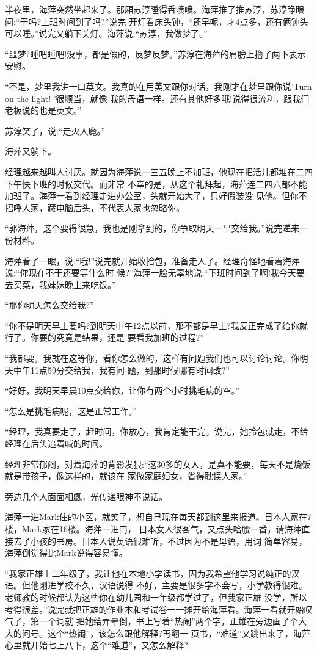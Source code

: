 \documentclass[11pt,a4paper,onecolumn]{article}
\begin{document}
半夜里，海萍突然坐起来了。那厢苏淳睡得香喷喷。海萍推了推苏淳，苏淳睁眼问:``干吗?上班时间到了吗?''说完
开灯看床头钟，``还早呢，才4点多，还有俩钟头可以睡。''说完又躺下关灯。海萍说:``苏淳，我做梦了。''

``噩梦?睡吧睡吧!没事，都是假的，反梦反梦。''苏淳在海萍的肩膀上撸了两下表示安慰。

``不是，梦里我讲一口英文。我真的在用英文跟你对话，我刚才在梦里跟你说'Turn on the light! '很顺当，就像
我的母语一样。还有其他好多哦!说得很流利，跟我们老板说的也是英文。''

苏淳笑了，说:``走火入魔。''

海萍又躺下。

经理越来越叫人讨厌。就因为海萍说一三五晚上不加班，他现在把活儿都堆在二四下午快下班的时候交代。而非常
不幸的是，从这个礼拜起，海萍连二四六都不能加班了。海萍一看到经理走进办公室，头就开始大了，只好假装没
见他。但你不招呼人家，藏电脑后头，不代表人家也忽略你。

``郭海萍，这个要得很急，我也是刚拿到的，你争取明天一早交给我。''说完递来一份材料。

海萍看了一眼，说:``哦!''说完就开始收拾包，准备走人了。经理奇怪地看着海萍说:``你现在不干还要等什么时
候?''海萍一脸无辜地说:``下班时间到了啊!我今天要去买菜，我妹妹晚上来吃饭。''

``那你明天怎么交给我?''

``你不是明天早上要吗?到明天中午12点以前，那不都是早上?我反正完成了给你就行了。你要的究竟是结果，还是
要看我加班的过程?''

``我都要。我就在这等你，看你怎么做的，这样有问题我们也可以讨论讨论。你明天中午11点59分交给我，我有问
题，到那时候哪有时间改?''

``好好，我明天早晨10点交给你，让你有两个小时挑毛病的空。''

``怎么是挑毛病呢，这是正常工作。''

``经理，我真要走了，赶时间，你放心，我肯定能干完。说完，她拎包就走，不给经理在后头追着喊的时间。

经理非常郁闷，对着海萍的背影发狠:``这30多的女人，是真不能要，每天不是烧饭就是带孩子，像这样的，就该在
家做家庭妇女，省得耽误人家。''

旁边几个人面面相觑，光传递眼神不说话。

海萍一进Mark住的小区，就笑了，想自己现在每天都到这里来报道。日本人家在7楼，Mark家在16楼。海萍一进门，
日本女人很客气，又点头哈腰一番，请海萍直接去了小孩的书房。日本人说英语很难听，不过因为不是母语，用词
简单容易，海萍倒觉得比Mark说得容易懂。

``我家正雄上二年级了，我让他在本地小学读书，因为我希望他学习说纯正的汉语。但他刚进学校不久，汉语说得
不好，主要是很多字不会写，小学教得很难。老师教的时候都认为这些你在幼儿园和一年级都学过了，但我家正雄
没学，所以考得很差。''说完就把正雄的作业本和考试卷一一摊开给海萍看。海萍一看就开始叹气了，第一个词就
把她给弄晕倒，书上写着``热闹''两个字，正雄在旁边画了个大大的问号。这个``热闹''，该怎么跟他解释?再翻一
页书，``难道''又跳出来了，海萍心里就开始七上八下，这个``难道''，又怎么解释?
\end{document}
